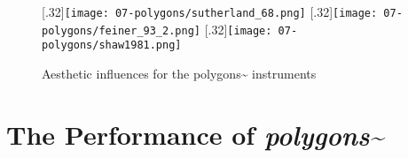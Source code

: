\begin{figure}
    \centering
    \captionsetup{justification=centering}
    [.32\linewidth]{\texttt{[image: 07-polygons/sutherland\_68.png]}}\label{fig: sutherland1968_in8}
    \hfill
    [.32\linewidth]{\texttt{[image: 07-polygons/feiner\_93\_2.png]}}\label{fig: feiner93_in8}
    \hfill
    [.32\linewidth]{\texttt{[image: 07-polygons/shaw1981.png]}}\label{fig: shaw1981}
    \caption{Aesthetic influences for the polygons\textasciitilde{} instruments}
    \label{fig: polygons-wireframes}
\end{figure}


\section{The Performance of \textit{polygons\textasciitilde{}}}\label{sec: polygons-performances}
